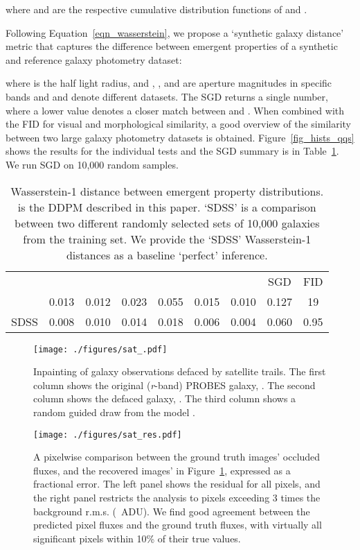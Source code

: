 \documentclass[fleqn,usenatbib]{mnras}
\begin{document}
where  and  are the respective cumulative distribution functions of  and .
 
Following Equation~\ref{eqn_wasserstein}, we propose a `synthetic galaxy
distance' metric that captures the difference between emergent properties of a
synthetic and reference galaxy photometry dataset:

where  is the half light radius, and , , and  are aperture
magnitudes in specific bands and  and  denote different datasets. The SGD
returns a single number, where a lower value denotes a closer match between 
and .  When combined with the FID for visual and morphological similarity,
a good overview of the similarity between two large galaxy photometry datasets
is obtained. Figure~\ref{fig_hists_qqs} shows the results for the individual
tests and the SGD summary is in Table~\ref{tab_results}.  We run SGD on 10,000
random samples.

\begin{table}
    \centering
    \caption{Wasserstein-1 distance between emergent property distributions.
     is the DDPM described in this paper. `SDSS' is
    a comparison between two different randomly selected sets of 10,000
    galaxies from the training set. We provide the `SDSS' Wasserstein-1 distances
    as a baseline `perfect' inference.}
    \setlength\tabcolsep{3pt}
    \begin{tabular}{l c c c c c c c c}
        \toprule
        &  &  &  &  &  &  & SGD & FID \\
        \cmidrule(r){1-7} \cmidrule(l){8-9}
         & 0.013 & 0.012 & 0.023 & 0.055 & 0.015 & 0.010 & 0.127 & 19 \\
        SDSS & 0.008 & 0.010 & 0.014 & 0.018 & 0.006 & 0.004 & 0.060 & 0.95 \\
        \bottomrule
    \end{tabular}
    \label{tab_results}
\end{table}

\begin{figure}
    \texttt{[image: ./figures/sat\_.pdf]}
    \caption{Inpainting of galaxy observations defaced by satellite trails. The
    first column shows the original ({\it r}-band)  PROBES galaxy,
    . The second column shows the defaced galaxy,
    . The third column shows a random guided draw from the
    model .}
    \label{fig_sats}
\end{figure}

\begin{figure}
    \centering
    \texttt{[image: ./figures/sat\_res.pdf]}
    \caption{A pixelwise comparison between the ground truth images' occluded
    fluxes, and the recovered images' in Figure~\ref{fig_sats}, expressed as a
    fractional error. The left panel shows the residual for all pixels, and the
    right panel restricts the analysis to pixels exceeding 3 times the
    background r.m.s. (~ADU).  We find good agreement
    between the predicted pixel fluxes and the ground truth fluxes, with
    virtually all significant pixels within 10\% of their true values.}
    \label{fig_sats2}
\end{figure}
\end{document}
